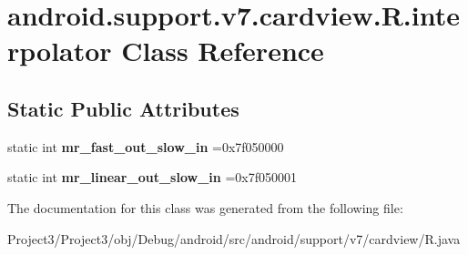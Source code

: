 \hypertarget{classandroid_1_1support_1_1v7_1_1cardview_1_1R_1_1interpolator}{}\section{android.\+support.\+v7.\+cardview.\+R.\+interpolator Class Reference}
\label{classandroid_1_1support_1_1v7_1_1cardview_1_1R_1_1interpolator}
\subsection*{Static Public Attributes}
\begin{DoxyCompactItemize}
\item 
\mbox{\label{classandroid_1_1support_1_1v7_1_1cardview_1_1R_1_1interpolator_ae591998f7e929f6ae2eebfa614a66e0c}} 
static int {\bfseries mr\+\_\+fast\+\_\+out\+\_\+slow\+\_\+in} =0x7f050000
\item 
\mbox{\label{classandroid_1_1support_1_1v7_1_1cardview_1_1R_1_1interpolator_a541a232d30080e259b56567afa4f544c}} 
static int {\bfseries mr\+\_\+linear\+\_\+out\+\_\+slow\+\_\+in} =0x7f050001
\end{DoxyCompactItemize}


The documentation for this class was generated from the following file\+:\begin{DoxyCompactItemize}
\item 
Project3/\+Project3/obj/\+Debug/android/src/android/support/v7/cardview/R.\+java\end{DoxyCompactItemize}
